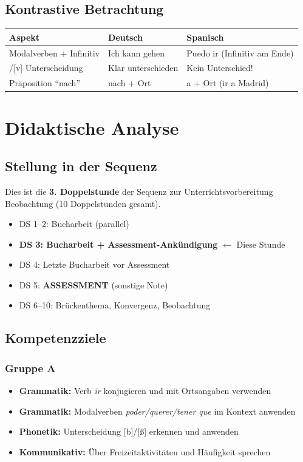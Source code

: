 \documentclass[11pt,a4paper]{article}
\begin{document}
\subsection{Kontrastive Betrachtung}

\begin{tabular}{|l|p{5cm}|p{5cm}|}
\hline
\textbf{Aspekt} & \textbf{Deutsch} & \textbf{Spanisch} \\
\hline
Modalverben + Infinitiv & Ich kann gehen & Puedo ir (Infinitiv am Ende) \\
\hline
[b]/[v] Unterscheidung & Klar unterschieden & Kein Unterschied! \\
\hline
Präposition ``nach'' & nach + Ort & a + Ort (ir a Madrid) \\
\hline
\end{tabular}

\section{Didaktische Analyse}

\subsection{Stellung in der Sequenz}
Dies ist die \textbf{3. Doppelstunde} der Sequenz zur Unterrichtsvorbereitung Beobachtung (10 Doppelstunden gesamt).

\begin{itemize}
    \item DS 1--2: Bucharbeit (parallel)
    \item \textbf{DS 3: Bucharbeit + Assessment-Ankündigung} $\leftarrow$ Diese Stunde
    \item DS 4: Letzte Bucharbeit vor Assessment
    \item DS 5: \textbf{ASSESSMENT} (sonstige Note)
    \item DS 6--10: Brückenthema, Konvergenz, Beobachtung
\end{itemize}

\subsection{Kompetenzziele}

\subsubsection{Gruppe A}
\begin{itemize}
    \item \textbf{Grammatik:} Verb \textit{ir} konjugieren und mit Ortsangaben verwenden
    \item \textbf{Grammatik:} Modalverben \textit{poder/querer/tener que} im Kontext anwenden
    \item \textbf{Phonetik:} Unterscheidung [b]/[\ss] erkennen und anwenden
    \item \textbf{Kommunikativ:} Über Freizeitaktivitäten und Häufigkeit sprechen
\end{itemize}
\end{document}
